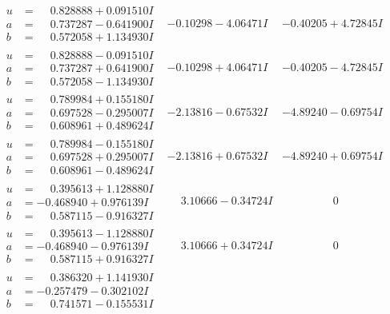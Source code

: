 \documentclass[1p]{elsarticle_modified}
\theoremstyle{definition}
\begin{document}
$$\begin{array}{c|c|c}
\begin{aligned}
u &= \phantom{-}0.828888 + 0.091510 I \\
a &= \phantom{-}0.737287 - 0.641900 I \\
b &= \phantom{-}0.572058 + 1.134930 I\end{aligned}
 & -0.10298 - 4.06471 I & -0.40205 + 4.72845 I \\ \hline\begin{aligned}
u &= \phantom{-}0.828888 - 0.091510 I \\
a &= \phantom{-}0.737287 + 0.641900 I \\
b &= \phantom{-}0.572058 - 1.134930 I\end{aligned}
 & -0.10298 + 4.06471 I & -0.40205 - 4.72845 I \\ \hline\begin{aligned}
u &= \phantom{-}0.789984 + 0.155180 I \\
a &= \phantom{-}0.697528 - 0.295007 I \\
b &= \phantom{-}0.608961 + 0.489624 I\end{aligned}
 & -2.13816 - 0.67532 I & -4.89240 - 0.69754 I \\ \hline\begin{aligned}
u &= \phantom{-}0.789984 - 0.155180 I \\
a &= \phantom{-}0.697528 + 0.295007 I \\
b &= \phantom{-}0.608961 - 0.489624 I\end{aligned}
 & -2.13816 + 0.67532 I & -4.89240 + 0.69754 I \\ \hline\begin{aligned}
u &= \phantom{-}0.395613 + 1.128880 I \\
a &= -0.468940 + 0.976139 I \\
b &= \phantom{-}0.587115 - 0.916327 I\end{aligned}
 & \phantom{-}3.10666 - 0.34724 I & \phantom{-0.000000 } 0 \\ \hline\begin{aligned}
u &= \phantom{-}0.395613 - 1.128880 I \\
a &= -0.468940 - 0.976139 I \\
b &= \phantom{-}0.587115 + 0.916327 I\end{aligned}
 & \phantom{-}3.10666 + 0.34724 I & \phantom{-0.000000 } 0 \\ \hline\begin{aligned}
u &= \phantom{-}0.386320 + 1.141930 I \\
a &= -0.257479 - 0.302102 I \\
b &= \phantom{-}0.741571 - 0.155531 I\end{aligned}

\end{array}$$
\end{document}

